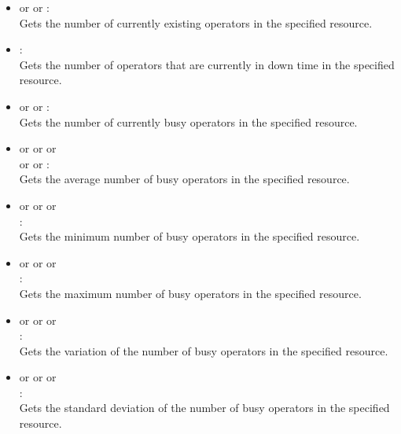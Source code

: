 \begin{itemize}

\item
{} or  or :\\
Gets the number of currently existing operators in the specified resource.

\item
{}:\\
Gets the number of operators that are currently in down time in the specified resource.

\item
{} or  or :\\
Gets the number of currently busy operators in the specified resource.

\item
{} or  or  or\\
 or  or :\\
Gets the average number of busy operators in the specified resource.

\item
{} or  or  or\\
:\\
Gets the minimum number of busy operators in the specified resource.

\item
{} or  or  or\\
:\\
Gets the maximum number of busy operators in the specified resource.

\item
{} or  or  or\\
:\\
Gets the variation of the number of busy operators in the specified resource.

\item
{} or  or  or\\
:\\
Gets the standard deviation of the number of busy operators in the specified resource.


\end{itemize}
